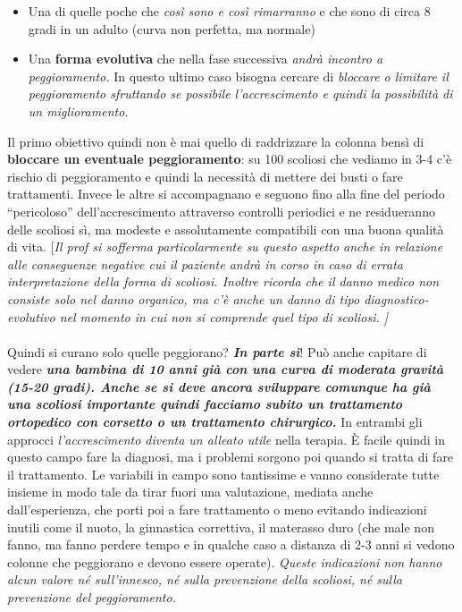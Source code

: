 \begin{itemize}
\item
  Una di quelle poche che \emph{così sono e così rimarranno} e che sono di circa 8 gradi in un adulto (curva non perfetta, ma normale)
\item
  Una \textbf{forma evolutiva} che nella fase successiva \emph{andrà incontro a peggioramento.} In questo ultimo caso bisogna cercare di \emph{\emph{bloccare o limitare il peggioramento sfruttando se possibile l'accrescimento e quindi la possibilità di un miglioramento.}}
\end{itemize}

Il primo obiettivo quindi non è mai quello di raddrizzare la colonna bensì di \textbf{bloccare un eventuale peggioramento}: su 100 scoliosi che vediamo in 3-4 c'è rischio di peggioramento e quindi la necessità di
mettere dei busti o fare trattamenti. Invece le altre si accompagnano e seguono fino alla fine del periodo ``pericoloso'' dell'accrescimento attraverso controlli periodici e ne residueranno delle scoliosi sì, ma
modeste e assolutamente compatibili con una buona qualità di vita.
{[}\emph{Il prof si sofferma particolarmente su questo aspetto anche in relazione alle conseguenze negative cui il paziente andrà in corso in caso di errata interpretazione della forma di scoliosi. Inoltre ricorda che il danno medico non consiste solo nel danno organico, ma c'è anche un danno di tipo \emph{diagnostico-evolutivo} nel momento in cui non si comprende quel tipo di scoliosi. {]}}
\\\\
Quindi si curano solo quelle peggiorano? \textbf{\emph{In parte sì}}!
Può anche capitare di vedere \textbf{\emph{una bambina di 10 anni già con una curva di moderata gravità (15-20 gradi). Anche se si deve ancora sviluppare comunque ha già una scoliosi importante quindi facciamo subito un trattamento ortopedico con corsetto o un trattamento chirurgico.}} In entrambi gli approcci \emph{l'accrescimento diventa un alleato utile} nella terapia. È facile quindi in questo campo fare la diagnosi, ma i problemi sorgono poi quando si tratta di fare il trattamento. Le variabili in campo sono tantissime e vanno considerate tutte insieme in modo tale da tirar fuori una valutazione, mediata anche dall'esperienza, che porti poi a fare trattamento o meno evitando indicazioni inutili come il nuoto, la ginnastica correttiva, il materasso duro (che male non fanno, ma fanno perdere tempo e in qualche caso a distanza di 2-3 anni si vedono colonne che peggiorano e devono essere operate). \emph{Queste indicazioni non hanno alcun valore né sull'innesco, né sulla prevenzione della scoliosi, né sulla prevenzione del peggioramento. }

